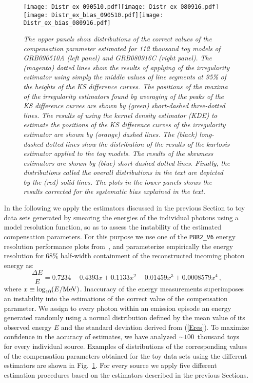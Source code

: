 \documentclass[12pt]{article}
\newcommand{\beq}{\begin{equation}}
\newcommand{\eeq}{\end{equation}}
\begin{document}
{%
\begin{figure}
\centering
\texttt{[image: Distr\_ex\_090510.pdf]}\hspace{0cm}\texttt{[image: Distr\_ex\_080916.pdf]}
\texttt{[image: Distr\_ex\_bias\_090510.pdf]}\hspace{0cm}\texttt{[image: Distr\_ex\_bias\_080916.pdf]}
\vspace{-0.4cm}
\caption{\it The upper panels show distributions of the correct values of the compensation parameter estimated for 112 thousand toy models
of GRB090510A (left panel) and GRB080916C (right panel).
The (magenta) dotted lines show the results of applying of the irregularity estimator using simply the middle values of line segments at 95\%
of the heights of the KS difference curves. The positions of the maxima of the irregularity estimators found
by averaging of the peaks of the KS difference curves are shown by (green) short-dashed three-dotted lines.
The results of using the kernel density estimator (KDE) to estimate the positions of the KS difference curves of the irregularity estimator are shown
by (orange) dashed lines. The (black) long-dashed dotted lines show the distribution of the results of the kurtosis
estimator applied to the toy models. The results of the skewness estimators are shown by
(blue) short-dashed dotted lines. Finally, the distributions called the overall distributions in the text are depicted by the (red) solid lines.
The plots in the lower panels shows the results corrected for the systematic bias explained in the text.}
\label{fig:TOYS}
\end{figure}

In the following we apply the estimators discussed in the previous Section to toy data sets generated by smearing the
energies of the individual photons using a model resolution function, so as to assess
the instability of the estimated compensation parameters.
For this purpose we use one of the {\tt P8R2\_V6} energy resolution performance plots from~\cite{FERMI_Eres}, and parameterize empirically the
energy resolution for 68\% half-width containment of the reconstructed incoming photon energy as:
\beq
\label{Eres}
\frac{\Delta E}{E} = 0.7234 - 0.4393x + 0.1133x^2 - 0.01459x^3 + 0.0008579x^4 \, ,
\eeq
where $x \equiv \log_{10}(E/{\rm MeV})$. Inaccuracy of the energy measurements superimposes
an instability into the estimations of the correct value of the compensation parameter.
We assign to every photon within an emission episode an energy generated randomly using a
normal distribution defined by the mean value of its observed energy $E$ and the
standard deviation derived from (\ref{Eres}). To maximize confidence in the accuracy
of estimates, we have analyzed $\sim 100$~thousand toys for every individual source.
Examples of distributions of the corresponding values of the compensation parameters obtained for the toy data sets
using the different estimators are shown in Fig.~\ref{fig:TOYS}.
For every source we apply five different estimation procedures based on the estimators described in the previous Sections.

}
\end{document}
